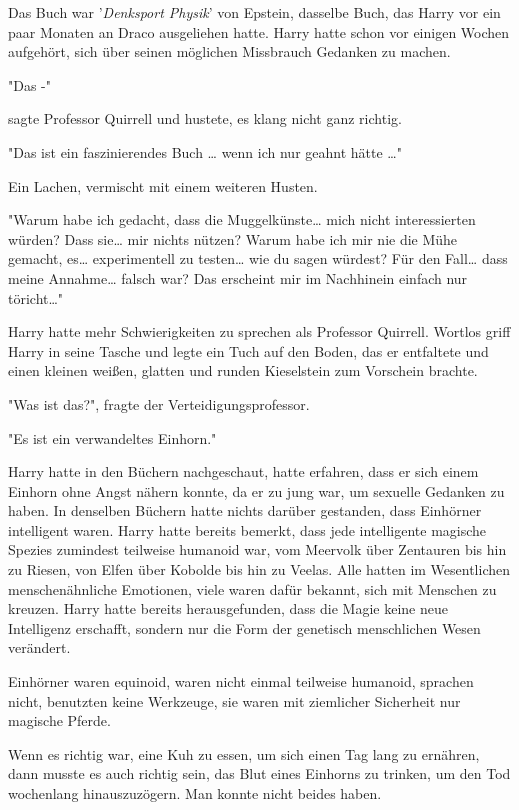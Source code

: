 {Das Buch war '\emph{Denksport Physik}' von Epstein, dasselbe Buch, das Harry vor ein paar Monaten an Draco ausgeliehen hatte. Harry hatte schon vor einigen Wochen aufgehört, sich über seinen möglichen Missbrauch Gedanken zu machen.

"Das -"

sagte Professor Quirrell und hustete, es klang nicht ganz richtig.

"Das ist ein faszinierendes Buch … wenn ich nur geahnt hätte …"

Ein Lachen, vermischt mit einem weiteren Husten.

"Warum habe ich gedacht, dass die Muggelkünste… mich nicht interessierten würden? Dass sie… mir nichts nützen? Warum habe ich mir nie die Mühe gemacht, es… experimentell zu testen… wie du sagen würdest? Für den Fall… dass meine Annahme… falsch war? Das erscheint mir im Nachhinein einfach nur töricht…"

Harry hatte mehr Schwierigkeiten zu sprechen als Professor Quirrell. Wortlos griff Harry in seine Tasche und legte ein Tuch auf den Boden, das er entfaltete und einen kleinen weißen, glatten und runden Kieselstein zum Vorschein brachte.

"Was ist das?", fragte der Verteidigungsprofessor.

"Es ist ein verwandeltes Einhorn."

Harry hatte in den Büchern nachgeschaut, hatte erfahren, dass er sich einem Einhorn ohne Angst nähern konnte, da er zu jung war, um sexuelle Gedanken zu haben. In denselben Büchern hatte nichts darüber gestanden, dass Einhörner intelligent waren. Harry hatte bereits bemerkt, dass jede intelligente magische Spezies zumindest teilweise humanoid war, vom Meervolk über Zentauren bis hin zu Riesen, von Elfen über Kobolde bis hin zu Veelas. Alle hatten im Wesentlichen menschenähnliche Emotionen, viele waren dafür bekannt, sich mit Menschen zu kreuzen. Harry hatte bereits herausgefunden, dass die Magie keine neue Intelligenz erschafft, sondern nur die Form der genetisch menschlichen Wesen verändert.

Einhörner waren equinoid, waren nicht einmal teilweise humanoid, sprachen nicht, benutzten keine Werkzeuge, sie waren mit ziemlicher Sicherheit nur magische Pferde.

Wenn es richtig war, eine Kuh zu essen, um sich einen Tag lang zu ernähren, dann musste es auch richtig sein, das Blut eines Einhorns zu trinken, um den Tod wochenlang hinauszuzögern. Man konnte nicht beides haben.

}

